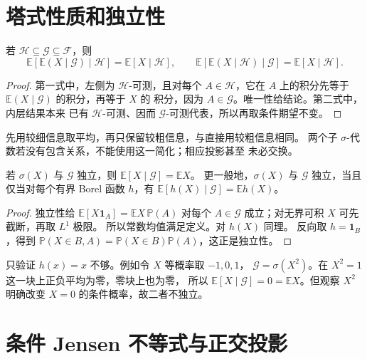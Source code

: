 \section{塔式性质和独立性}
\label{sec:conditional-tower-independence}

\begin{theorem}[塔式性质]
\label{thm:conditional-tower}
若 $\mathcal H\subseteq\mathcal G\subseteq\mathcal F$，则
\[
 \mathbb E[\mathbb E(X\mid\mathcal G)\mid\mathcal H]
       =\mathbb E[X\mid\mathcal H],\qquad
 \mathbb E[\mathbb E(X\mid\mathcal H)\mid\mathcal G]
       =\mathbb E[X\mid\mathcal H].
\]
\end{theorem}

\begin{proof}
第一式中，左侧为 $\mathcal H$-可测，且对每个 $A\in\mathcal H$，它在
$A$ 上的积分先等于 $\mathbb E(X\mid\mathcal G)$ 的积分，再等于 $X$ 的
积分，因为 $A\in\mathcal G$。唯一性给结论。第二式中，内层结果本来
已有 $\mathcal H$-可测、因而 $\mathcal G$-可测代表，所以再取条件期望不变。
\end{proof}

先用较细信息取平均，再只保留较粗信息，与直接用较粗信息相同。
两个子 $\sigma$-代数若没有包含关系，不能使用这一简化；相应投影甚至
未必交换。

\begin{proposition}
\label{prop:conditional-independence}
若 $\sigma(X)$ 与 $\mathcal G$ 独立，则
$\mathbb E[X\mid\mathcal G]=\mathbb EX$。
更一般地，$\sigma(X)$ 与 $\mathcal G$ 独立，当且仅当对每个有界 Borel
函数 $h$，有 $\mathbb E[h(X)\mid\mathcal G]=\mathbb Eh(X)$。
\end{proposition}

\begin{proof}
独立性给 $\mathbb E[X\mathbf1_A]=\mathbb EX\,\mathbb P(A)$ 对每个
$A\in\mathcal G$ 成立；对无界可积 $X$ 可先截断，再取 $L^1$ 极限。
所以常数均值满足定义。对 $h(X)$ 同理。
反向取 $h=\mathbf1_B$，得到
$\mathbb P(X\in B,A)=\mathbb P(X\in B)\mathbb P(A)$，这正是独立性。
\end{proof}

只验证 $h(x)=x$ 不够。例如令 $X$ 等概率取 $-1,0,1$，
$\mathcal G=\sigma(X^2)$。在 $X^2=1$ 这一块上正负平均为零，零块上也为零，
所以 $\mathbb E[X\mid\mathcal G]=0=\mathbb EX$。但观察 $X^2$ 明确改变
$X=0$ 的条件概率，故二者不独立。

\section{条件 Jensen 不等式与正交投影}
\label{sec:conditional-jensen-projection}

